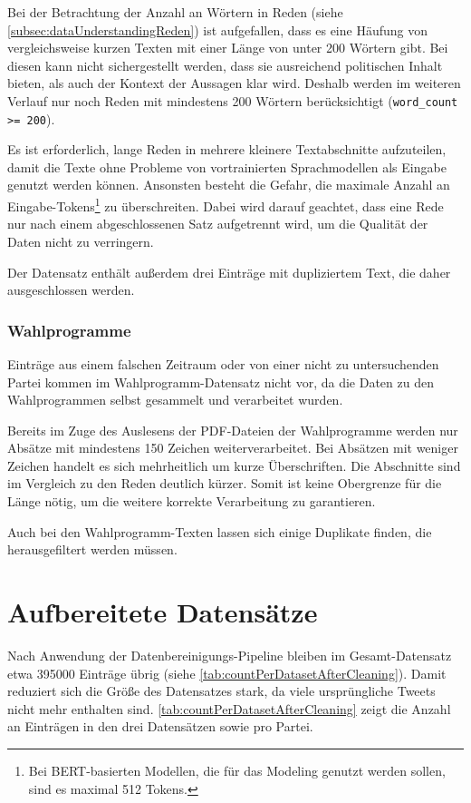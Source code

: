 Bei der Betrachtung der Anzahl an Wörtern in Reden (siehe \autoref{subsec:dataUnderstandingReden}) ist aufgefallen, dass es eine Häufung von vergleichsweise kurzen Texten mit einer Länge von unter \num{200} Wörtern gibt. Bei diesen kann nicht sichergestellt werden, dass sie ausreichend politischen Inhalt bieten, als auch der Kontext der Aussagen klar wird. Deshalb werden im weiteren Verlauf nur noch Reden mit mindestens 200 Wörtern berücksichtigt (\texttt{word\_count >= 200}).

Es ist erforderlich, lange Reden in mehrere kleinere Textabschnitte aufzuteilen, damit die Texte ohne Probleme von vortrainierten Sprachmodellen als Eingabe genutzt werden können. Ansonsten besteht die Gefahr, die maximale Anzahl an Eingabe-Tokens\footnote{Bei BERT-basierten Modellen, die für das Modeling genutzt werden sollen, sind es maximal \num{512} Tokens.} zu überschreiten. Dabei wird darauf geachtet, dass eine Rede nur nach einem abgeschlossenen Satz aufgetrennt wird, um die Qualität der Daten nicht zu verringern.

Der Datensatz enthält außerdem drei Einträge mit dupliziertem Text, die daher ausgeschlossen werden.

\subsubsection*{Wahlprogramme}

Einträge aus einem falschen Zeitraum oder von einer nicht zu untersuchenden Partei kommen im Wahlprogramm-Datensatz nicht vor, da die Daten zu den Wahlprogrammen selbst gesammelt und verarbeitet wurden.

Bereits im Zuge des Auslesens der \ac{PDF}-Dateien der Wahlprogramme werden nur Absätze mit mindestens \num{150} Zeichen weiterverarbeitet. Bei Absätzen mit weniger Zeichen handelt es sich mehrheitlich um kurze Überschriften. Die Abschnitte sind im Vergleich zu den Reden deutlich kürzer. Somit ist keine Obergrenze für die Länge nötig, um die weitere korrekte Verarbeitung zu garantieren.

Auch bei den Wahlprogramm-Texten lassen sich einige Duplikate finden, die herausgefiltert werden müssen.


\section{Aufbereitete Datensätze} \label{sec:processedDataframes}

Nach Anwendung der Datenbereinigungs-Pipeline bleiben im Gesamt-Datensatz etwa \num{395000} Einträge übrig (siehe \autoref{tab:countPerDatasetAfterCleaning}). Damit reduziert sich die Größe des Datensatzes stark, da viele ursprüngliche Tweets nicht mehr enthalten sind. \autoref{tab:countPerDatasetAfterCleaning} zeigt die Anzahl an Einträgen in den drei Datensätzen sowie pro Partei.


